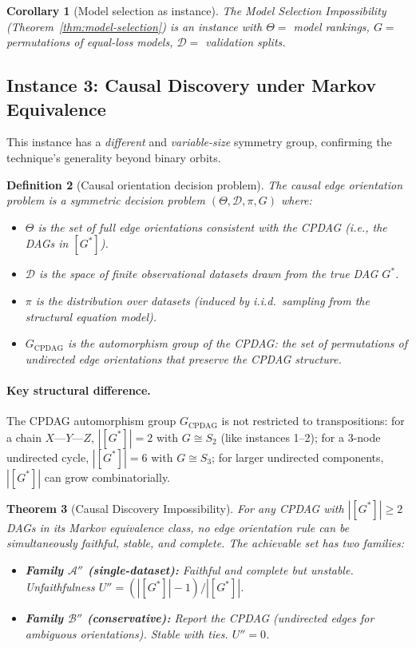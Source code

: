 \documentclass{article}
\newtheorem{theorem}{Theorem}
\newtheorem{corollary}[theorem]{Corollary}
\newtheorem{definition}[theorem]{Definition}
\begin{document}
\begin{corollary}[Model selection as instance]
\label{cor:model-selection-instance}
The Model Selection Impossibility
(Theorem~\ref{thm:model-selection}) is an instance with
$\Theta =$ model rankings, $G =$ permutations of equal-loss models,
$\mathcal{D} =$ validation splits.
\end{corollary}

\subsection{Instance 3: Causal Discovery under Markov Equivalence}

This instance has a \emph{different} and \emph{variable-size} symmetry group, confirming the technique's generality beyond binary orbits.

\begin{definition}[Causal orientation decision problem]
The causal edge orientation problem is a symmetric decision problem $(\Theta, \mathcal{D}, \pi, G)$ where:
\begin{itemize}
    \item $\Theta$ is the set of full edge orientations consistent with the CPDAG (i.e., the DAGs in $[G^*]$).
    \item $\mathcal{D}$ is the space of finite observational datasets drawn from the true DAG $G^*$.
    \item $\pi$ is the distribution over datasets (induced by i.i.d.\ sampling from the structural equation model).
    \item $G_{\text{CPDAG}}$ is the \emph{automorphism group of the CPDAG}: the set of permutations of undirected edge orientations that preserve the CPDAG structure.
\end{itemize}
\end{definition}

\paragraph{Key structural difference.}
The CPDAG automorphism group $G_{\text{CPDAG}}$ is not restricted to transpositions: for a chain $X\text{---}Y\text{---}Z$, $|[G^*]| = 2$ with $G \cong S_2$ (like instances 1--2); for a 3-node undirected cycle, $|[G^*]| = 6$ with $G \cong S_3$; for larger undirected components, $|[G^*]|$ can grow combinatorially.

\begin{theorem}[Causal Discovery Impossibility]
\label{thm:causal-discovery}
For any CPDAG with $|[G^*]| \geq 2$ DAGs in its Markov equivalence class, no edge orientation rule can be simultaneously faithful, stable, and complete.
The achievable set has two families:
\begin{itemize}
    \item \textbf{Family $\mathcal{A}''$ (single-dataset):} Faithful and complete but unstable. Unfaithfulness $U'' = (|[G^*]|-1)/|[G^*]|$.
    \item \textbf{Family $\mathcal{B}''$ (conservative):} Report the CPDAG (undirected edges for ambiguous orientations). Stable with ties. $U'' = 0$.
\end{itemize}
\end{theorem}
\end{document}
